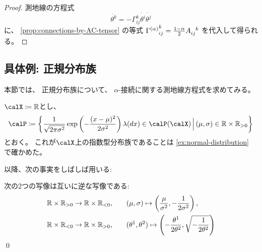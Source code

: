 \documentclass[report]{jlreq}
\begin{document}
\begin{proof}
    測地線の方程式
    \begin{equation}
        \ddot{\theta^k}
            = - \Gamma_{ij}^k \dot{\theta^i} \dot{\theta^j}
    \end{equation}
    に、
    \cref{prop:connections-by-AC-tensor}
    の等式
    ${\Gamma^{(\alpha)}}_{ij}^k = \frac{1 - \alpha}{2} A_{ij}^{\hphantom{ij}k}$
    を代入して得られる。
\end{proof}



%
\subsection{具体例: 正規分布族}

本節では、
正規分布族について、
$\alpha$-接続に関する測地線方程式を求めてみる。

\begin{settings}[正規分布族]
    $\calX \coloneqq \R$とし、
    \begin{equation}
        \calP \coloneqq \mybrace{
            \frac{1}{\sqrt{2 \pi \sigma^2}}
            \exp\myparen{
                - \frac{(x - \mu)^2}{2 \sigma^2}
            }
            \lambda(dx)
            \in \calP(\calX)
            \, \Big| \,
            (\mu, \sigma) \in \R \times \R_{> 0}
        }
    \end{equation}
    とおく。
    これが$\calX$上の指数型分布族であることは
    \cref{ex:normal-distribution}
    で確かめた。
\end{settings}

以降、次の事実をしばしば用いる:

\begin{fact}
    次の2つの写像は互いに逆な{\smooth}写像である:
    \begin{alignat}{1}
        \mathbb{R} \times \mathbb{R}_{> 0} \to \mathbb{R} \times \mathbb{R}_{< 0},
            \qquad
            &(\mu, \sigma)
            \mapsto
            \left({
                \frac{\mu}{\sigma^2},
                - \frac{1}{2\sigma^2}
            }\right),
            \\
        \mathbb{R} \times \mathbb{R}_{< 0} \to \mathbb{R} \times \mathbb{R}_{> 0},
            \qquad
            &(\theta^1, \theta^2)
            \mapsto
            \left({
                - \frac{\theta^1}{2\theta^2},
                \sqrt{- \frac{1}{2\theta^2}}
            }\right)
    \end{alignat}
    \qed
\end{fact}
\end{document}
